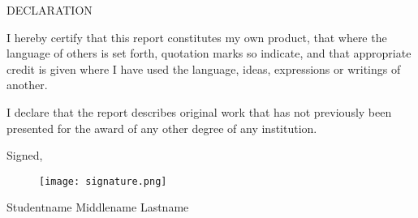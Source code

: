 \begin{center}
    DECLARATION
    \vspace{5mm} %
\end{center} 

I hereby certify that this report constitutes my own product, that where the language of others is set forth, quotation marks so indicate, and that appropriate credit is given where I have used the language, ideas, expressions or writings of another.

\vspace{1em}

I declare that the report describes original work that has not previously been presented for the award of any other degree of any institution.

\vspace{2em}

\noindent\hspace{8cm}Signed,
\begin{figure}[H]
    \hspace{8cm}
    \texttt{[image: signature.png]}  %
\end{figure}

\noindent\hspace{8cm}Studentname Middlename Lastname  %
